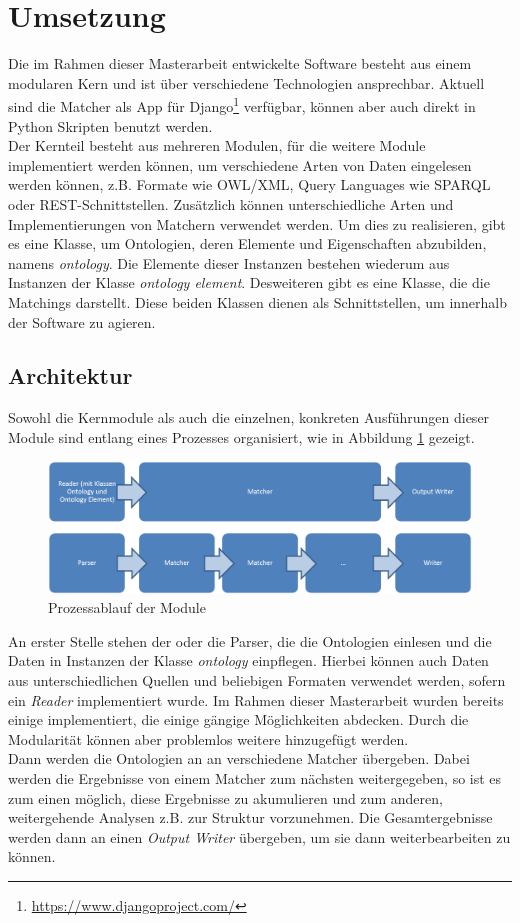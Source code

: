 		\section{Umsetzung}
		Die im Rahmen dieser Masterarbeit entwickelte Software besteht aus einem
		modularen Kern und ist über verschiedene Technologien ansprechbar. Aktuell
		sind die Matcher als App
		für Django\footnote{\url{https://www.djangoproject.com/}} verfügbar, können
		aber auch direkt in Python Skripten benutzt werden.\\
		Der Kernteil besteht aus mehreren Modulen, für die weitere Module
		implementiert werden können, um verschiedene Arten von Daten eingelesen
		werden können, z.B.
		Formate wie OWL/XML, Query Languages wie SPARQL oder REST-Schnittstellen.
		Zusätzlich können unterschiedliche Arten und Implementierungen von Matchern
		verwendet werden. Um dies zu realisieren, gibt es eine Klasse, um Ontologien,
		deren Elemente und Eigenschaften abzubilden, namens \textit{ontology}.
		Die Elemente dieser Instanzen bestehen wiederum aus Instanzen der Klasse \textit{ontology element}.
		Desweiteren gibt es eine Klasse, die die Matchings darstellt.
		Diese beiden Klassen dienen als Schnittstellen, um innerhalb der Software zu agieren.
		\subsection{Architektur}
		Sowohl die Kernmodule als auch die einzelnen, konkreten Ausführungen dieser
		Module sind entlang eines Prozesses organisiert, wie in Abbildung \ref{fig2}
		gezeigt.
		\begin{figure}[ht]
		\centering
		\includegraphics[width=1.0\textwidth]{pics/Module-overview.png}
		\caption{Prozessablauf der Module}
		\label{fig2}
		\end{figure}
		An erster Stelle stehen der oder die Parser, die die Ontologien einlesen und
		die Daten in Instanzen der Klasse \textit{ontology} einpflegen. Hierbei können
		auch Daten aus unterschiedlichen Quellen und beliebigen Formaten verwendet
		werden, sofern ein \textit{Reader} implementiert wurde. Im Rahmen dieser
		Masterarbeit wurden bereits einige implementiert, die einige gängige
		Möglichkeiten abdecken. Durch die Modularität können aber problemlos weitere
		hinzugefügt werden.\\
		Dann werden die Ontologien an an verschiedene Matcher übergeben. Dabei werden
		die Ergebnisse von einem Matcher zum nächsten weitergegeben, so ist es zum
		einen möglich, diese Ergebnisse zu akumulieren und zum
		anderen, weitergehende Analysen z.B. zur Struktur vorzunehmen.
		Die Gesamtergebnisse werden dann an einen \textit{Output Writer} übergeben, um
		sie dann weiterbearbeiten zu können.
		
